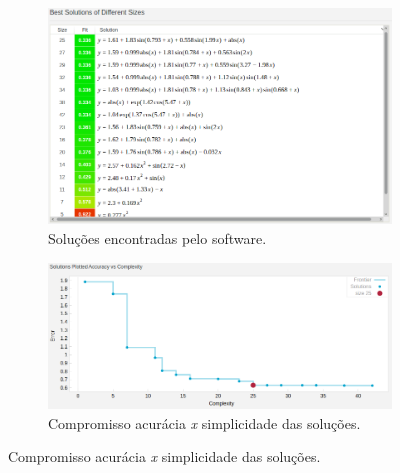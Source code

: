 \FloatBarrier
			    
	\begin{figure}[h!]
	
	\centering
	
		\begin{subfigure}{.45\textwidth} 
		  \centering
		  \includegraphics[width=1\linewidth]{aproximacao/best_solucao_map1_r}
		  \caption{\centering Soluções encontradas pelo software.} 
		  \label{fig:map1_solucoes_c_ruido} 
		\end{subfigure}%
		\begin{subfigure}{.55\textwidth}
		  \centering
		  \includegraphics[width=1\linewidth]{aproximacao/pareto_map1_r}
		  \caption{\centering Compromisso acurácia \textit{x} simplicidade das
		  soluções.}
		  \label{fig:map1_pareto_c_ruido} 
		\end{subfigure}
	

\end{figure}
